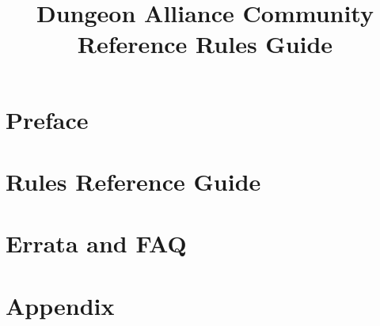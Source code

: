 

\title{Dungeon Alliance Community Reference Rules Guide} %


\section{Preface}
\label{sec:Preface}


\newpage
\setcounter{secnumdepth}{4}
\setcounter{tocdepth}{2}
\tableofcontents

\clearpage
\section{Rules Reference Guide}
\label{sec:RulesReferenceGuide}


\clearpage
\section{Errata and FAQ}
\label{sec:ErrataAndFAQ}


\clearpage
\section{Appendix}
\label{sec:Appendix}


\clearpage
\onecolumn
\fancyhf{} %
\pagestyle{fancy}
\rfoot{\thepage}
\printindex

